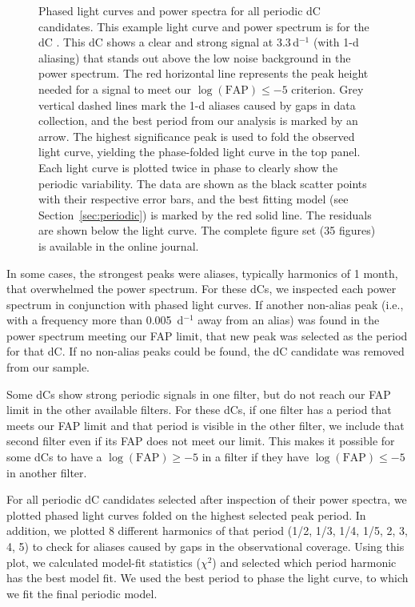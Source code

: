 \documentclass[twocolumn]{aastex631}
\begin{document}

\begin{figure*}
\centering
\caption{Phased light curves and power spectra for all periodic dC candidates. This example light curve and power spectrum is for the dC . This dC shows a clear and strong signal at 3.3\,d$^{-1}$ (with 1-d aliasing) that stands out above the low noise background in the power spectrum. The red horizontal line represents the peak height needed for a signal to meet our $\log{\left( \textrm{FAP} \right)} \leq -5$ criterion. Grey vertical dashed lines mark the 1-d aliases caused by gaps in data collection, and the best period from our analysis is marked by an arrow. The highest significance peak is used to fold the observed light curve, yielding the phase-folded light curve in the top panel. Each light curve is plotted twice in phase to clearly show the periodic variability. The data are shown as the black scatter points with their respective error bars, and the best fitting model (see Section~\ref{sec:periodic}) is marked by the red solid line. The residuals are shown below the light curve. The complete figure set (35 figures) is available in the online journal.}
\label{fig:powerspec_compare}
\end{figure*}

In some cases, the strongest peaks were aliases, typically harmonics of 1 month, that overwhelmed the power spectrum. For these dCs, we inspected each power spectrum in conjunction with phased light curves. If another non-alias peak (i.e., with a frequency more than 0.005~d$^{-1}$ away from an alias) was found in the power spectrum meeting our FAP limit, that new peak was selected as the period for that dC. If no non-alias peaks could be found, the dC candidate was removed from our sample. 

Some dCs show strong periodic signals in one filter, but do not reach our FAP limit in the other available filters. For these dCs, if one filter has a period that meets our FAP limit and that period is visible in the other filter, we include that second filter even if its FAP does not meet our limit. This makes it possible for some dCs to have a $\log{\left( \textrm{FAP} \right)} \geq -5$ in a filter if they have $\log{\left( \textrm{FAP} \right)} \leq -5$ in another filter.

For all periodic dC candidates selected after inspection of their power spectra, we plotted phased light curves folded on the highest selected peak period. In addition, we plotted 8 different harmonics of that period (1/2, 1/3, 1/4, 1/5, 2, 3, 4, 5) to check for aliases caused by gaps in the observational coverage. Using this plot, we calculated model-fit statistics ($\chi^2$) and selected which period harmonic has the best model fit. We used the best period to phase the light curve, to which we fit the final periodic model.
\end{document}
